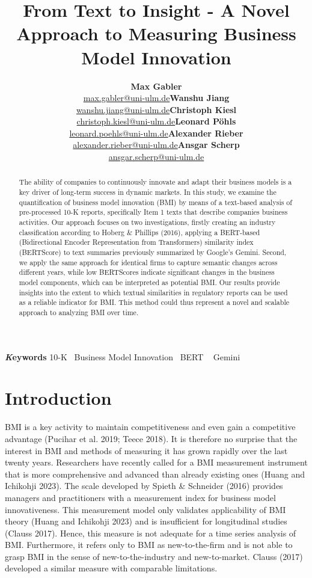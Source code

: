 \documentclass[
]{article}
\title{From Text to Insight - A Novel Approach to Measuring Business
Model Innovation}
\author{\textbf{Max
Gabler}\\\href{mailto:max.gabler@uni-ulm.de}{max.gabler@uni-ulm.de}\asep\textbf{Wanshu
Jiang}\\\href{mailto:wanshu.jiang@uni-ulm.de}{wanshu.jiang@uni-ulm.de}\asep\textbf{Christoph
Kiesl}\\\href{mailto:christoph.kiesl@uni-ulm.de}{christoph.kiesl@uni-ulm.de}\asep\textbf{Leonard
Pöhls}\\\href{mailto:leonard.poehls@uni-ulm.de}{leonard.poehls@uni-ulm.de}\asep\textbf{Alexander
Rieber}\\\href{mailto:alexander.rieber@uni-ulm.de}{alexander.rieber@uni-ulm.de}\asep\textbf{Ansgar
Scherp}\\\href{mailto:ansgar.scherp@uni-ulm.de}{ansgar.scherp@uni-ulm.de}}
\date{}
\renewcommand*\contentsname{Table of contents}
\newcommand\contentsname{Table of contents}
\begin{document}
\maketitle
\begin{abstract}
The ability of companies to continuously innovate and adapt their
business models is a key driver of long-term success in dynamic markets.
In this study, we examine the quantification of business model
innovation (BMI) by means of a text-based analysis of pre-processed 10-K
reports, specifically Item 1 texts that describe companies business
activities. Our approach focuses on two investigations, firstly creating
an industry classification according to Hoberg \& Phillips (2016),
applying a BERT-based (Bidirectional Encoder Representation from
Transformers) similarity index (BERTScore) to text summaries previously
summarized by Google's Gemini. Second, we apply the same approach for
identical firms to capture semantic changes across different years,
while low BERTScores indicate significant changes in the business model
components, which can be interpreted as potential BMI. Our results
provide insights into the extent to which textual similarities in
regulatory reports can be used as a reliable indicator for BMI. This
method could thus represent a novel and scalable approach to analyzing
BMI over time.
\end{abstract}
{\bfseries \emph Keywords}
\def\sep{\textbullet\ }
10-K \sep Business Model Innovation \sep BERT \sep 
Gemini


\renewcommand*\contentsname{Table of contents}
{
\hypersetup{linkcolor=}
\setcounter{tocdepth}{3}
\tableofcontents
}
\newpage{}

\section{Introduction}\label{introduction}

BMI is a key activity to maintain competitiveness and even gain a
competitive advantage (Pucihar et al. 2019; Teece 2018). It is therefore
no surprise that the interest in BMI and methods of measuring it has
grown rapidly over the last twenty years. Researchers have recently
called for a BMI measurement instrument that is more comprehensive and
advanced than already existing ones (Huang and Ichikohji 2023). The
scale developed by Spieth \& Schneider (2016) provides managers and
practitioners with a measurement index for business model
innovativeness. This measurement model only validates applicability of
BMI theory (Huang and Ichikohji 2023) and is insufficient for
longitudinal studies (Clauss 2017). Hence, this measure is not adequate
for a time series analysis of BMI. Furthermore, it refers only to BMI as
new-to-the-firm and is not able to grasp BMI in the sense of
new-to-the-industry and new-to-market. Clauss (2017) developed a similar
measure with comparable limitations.
\end{document}
